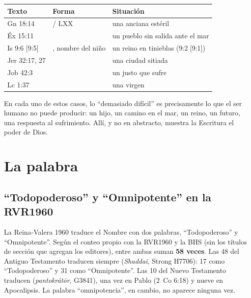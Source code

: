 \begin{center}\small\renewcommand{\arraystretch}{1.25}
\begin{tabular}{@{}L{2.6cm}L{5.4cm}L{6.4cm}@{}}
\toprule
\textbf{Texto} & \textbf{Forma} & \textbf{Situación} \\ \midrule
Gn 18:14 &  / LXX  & una anciana estéril \\
Éx 15:11 &  & un pueblo sin salida ante el mar \\
Is 9:6 [9:5] & , nombre del niño & un reino en tinieblas (9:2 [9:1]) \\
Jer 32:17, 27 &  & una ciudad sitiada \\
Job 42:3 &  & un justo que sufre \\
Lc 1:37 &  & una virgen \\
\bottomrule
\end{tabular}\end{center}

En cada uno de estos casos, lo ``demasiado difícil'' es precisamente lo que el ser humano no puede producir: un hijo, un camino en el mar, un reino, un futuro, una respuesta al sufrimiento. Allí, y no en abstracto, muestra la Escritura el poder de Dios.

\section{La palabra}

\subsection{“Todopoderoso” y “Omnipotente” en la RVR1960}\label{sec:shaddai}

La Reina-Valera 1960 traduce el Nombre con dos palabras, ``Todopoderoso'' y ``Omnipotente''. Según el conteo propio con la RVR1960 y la BHS (sin los títulos de sección que agregan los editores), entre ambas suman \textbf{58 veces}. Las 48 del Antiguo Testamento traducen siempre  (\emph{Shaddai}, Strong H7706): 17 como ``Todopoderoso'' y 31 como ``Omnipotente''. Las 10 del Nuevo Testamento traducen  (\emph{pantokrátōr}, G3841), una vez en Pablo (2~Co 6:18) y nueve en Apocalipsis. La palabra ``omnipotencia'', en cambio, no aparece ninguna vez.


